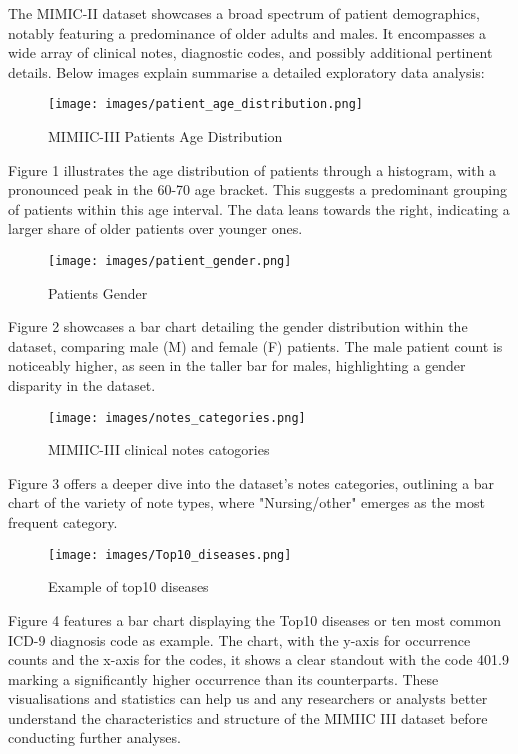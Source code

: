\documentclass[journal,article,submit,pdftex,moreauthors]{Definitions/mdpi}
\begin{document}
The MIMIC-II dataset showcases a broad spectrum of patient demographics, notably featuring a predominance of older adults and males. It encompasses a wide array of clinical notes, diagnostic codes, and possibly additional pertinent details. Below images explain summarise a detailed exploratory data analysis:
\begin{figure}[H]
\centering
\texttt{[image: images/patient\_age\_distribution.png]}
\caption{\label{fig1}MIMIIC-III Patients Age Distribution}
\end{figure}
Figure 1 illustrates the age distribution of patients through a histogram, with a pronounced peak in the 60-70 age bracket. This suggests a predominant grouping of patients within this age interval. The data leans towards the right, indicating a larger share of older patients over younger ones.
\begin{figure}[H]
\centering
\texttt{[image: images/patient\_gender.png]}
\caption{\label{fig2}Patients Gender}
\end{figure}
Figure 2 showcases a bar chart detailing the gender distribution within the dataset, comparing male (M) and female (F) patients. The male patient count is noticeably higher, as seen in the taller bar for males, highlighting a gender disparity in the dataset.
\begin{figure}[H]
\centering
\texttt{[image: images/notes\_categories.png]}
\caption{\label{fig3}MIMIIC-III clinical notes catogories}
\end{figure}
Figure 3 offers a deeper dive into the dataset's notes categories, outlining a bar chart of the variety of note types, where "Nursing/other" emerges as the most frequent category.
\begin{figure}[H]
\centering
\texttt{[image: images/Top10\_diseases.png]}
\caption{\label{fig4}Example of top10 diseases}
\end{figure} 
Figure 4 features a bar chart displaying the Top10 diseases or ten most common ICD-9 diagnosis code as example. The chart, with the y-axis for occurrence counts and the x-axis for the codes, it shows a clear standout with the code 401.9 marking a significantly higher occurrence than its counterparts.
These visualisations and statistics can help us and any researchers or analysts better understand the characteristics and structure of the MIMIIC III dataset before conducting further analyses.  \\
\end{document}
